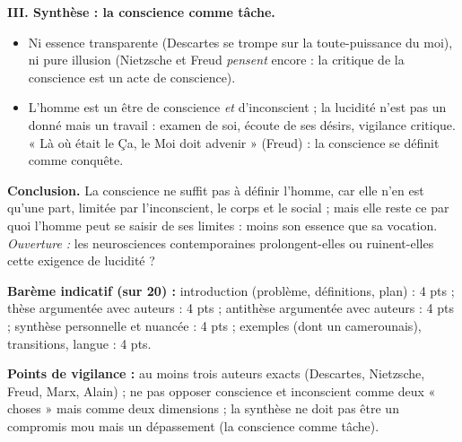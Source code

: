 \documentclass[11pt]{article}
\begin{document}
\begin{corrige}
\textbf{III. Synthèse : la conscience comme tâche.}
\begin{itemize}
\item Ni essence transparente (Descartes se trompe sur la toute-puissance du moi), ni pure illusion (Nietzsche et Freud \emph{pensent} encore : la critique de la conscience est un acte de conscience).
\item L'homme est un être de conscience \emph{et} d'inconscient ; la lucidité n'est pas un donné mais un travail : examen de soi, écoute de ses désirs, vigilance critique. « Là où était le Ça, le Moi doit advenir » (Freud) : la conscience se définit comme conquête.
\end{itemize}

\textbf{Conclusion.} La conscience ne suffit pas à définir l'homme, car elle n'en est qu'une part, limitée par l'inconscient, le corps et le social ; mais elle reste ce par quoi l'homme peut se saisir de ses limites : moins son essence que sa vocation. \emph{Ouverture :} les neurosciences contemporaines prolongent-elles ou ruinent-elles cette exigence de lucidité ?

\textbf{Barème indicatif (sur 20) :} introduction (problème, définitions, plan) : 4 pts ; thèse argumentée avec auteurs : 4 pts ; antithèse argumentée avec auteurs : 4 pts ; synthèse personnelle et nuancée : 4 pts ; exemples (dont un camerounais), transitions, langue : 4 pts.

\textbf{Points de vigilance :} au moins trois auteurs exacts (Descartes, Nietzsche, Freud, Marx, Alain) ; ne pas opposer conscience et inconscient comme deux « choses » mais comme deux dimensions ; la synthèse ne doit pas être un compromis mou mais un dépassement (la conscience comme tâche).
\end{corrige}
\end{document}
